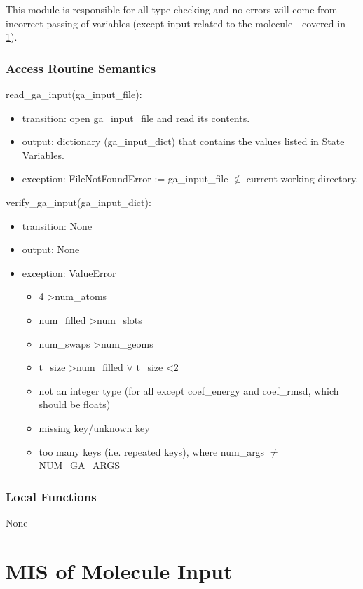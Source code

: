 \documentclass[12pt, titlepage]{article}
\begin{document}
This module is responsible for all type checking and no errors will come from 
incorrect passing of variables (except input related to the molecule - covered 
in \ref{section-mol_input}).

\subsubsection{Access Routine Semantics}

\noindent read\_ga\_input(ga\_input\_file):
\begin{itemize}
	\item transition: open ga\_input\_file and read its contents.
	\item output: dictionary (ga\_input\_dict) that contains the values listed 
	in State Variables.
	\item exception: FileNotFoundError := ga\_input\_file $\notin$ current 
	working directory.
\end{itemize}

\noindent verify\_ga\_input(ga\_input\_dict):
\begin{itemize}
	\item transition: None
	\item output: None
	\item exception: ValueError
	\begin{itemize}
		\item 4 \textgreater num\_atoms
		\item num\_filled \textgreater num\_slots
		\item num\_swaps \textgreater num\_geoms
		\item t\_size \textgreater num\_filled $\lor$ t\_size \textless 2
		\item not an integer type (for all except coef\_energy and coef\_rmsd, 
		which should be floats)
		\item missing key/unknown key
		\item too many keys (i.e. repeated keys), where num\_args $\neq$ 
		NUM\_GA\_ARGS 
	\end{itemize}
\end{itemize}

\subsubsection{Local Functions}

None

\section{MIS of Molecule Input} \label{section-mol_input}
\end{document}
